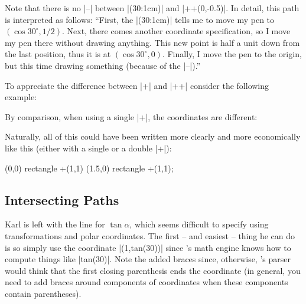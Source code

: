 Note that there is no |--| between |(30:1cm)| and |++(0,-0.5)|. In detail, this
path is interpreted as follows: ``First, the |(30:1cm)| tells me to move my pen
to $(\cos 30^\circ,1/2)$. Next, there comes another coordinate specification,
so I move my pen there without drawing anything. This new point is half a unit
down from the last position, thus it is at $(\cos 30^\circ,0)$. Finally, I move
the pen to the origin, but this time drawing something (because of the |--|).''

To appreciate the difference between |+| and |++| consider the following
example:
%
\begin{codeexample}[]
\end{codeexample}

By comparison, when using a single |+|, the coordinates are different:
%
\begin{codeexample}[]
\end{codeexample}


Naturally, all of this could have been written more clearly and more
economically like this (either with a single or a double |+|):
%
\begin{codeexample}[]
\tikz \draw (0,0) rectangle +(1,1)  (1.5,0) rectangle +(1,1);
\end{codeexample}


\subsection{Intersecting Paths}

Karl is left with the line for $\tan \alpha$, which seems difficult to specify
using transformations and polar coordinates. The first -- and easiest -- thing
he can do is so simply use the coordinate |(1,{tan(30)})| since \tikzname's
math engine knows how to compute things like |tan(30)|. Note the added braces
since, otherwise, \tikzname's parser would think that the first closing
parenthesis ends the coordinate (in general, you need to add braces around
components of coordinates when these components contain parentheses).

